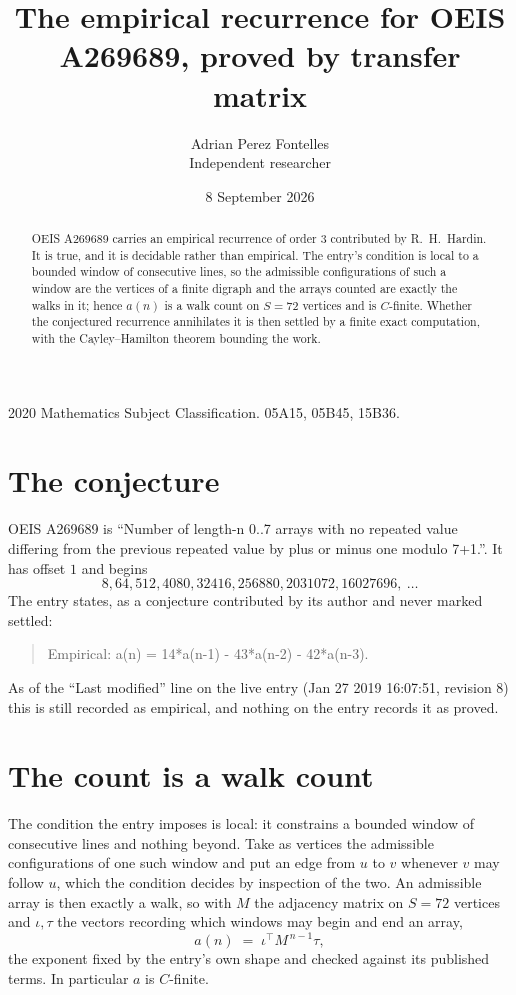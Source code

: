 \documentclass[11pt,a4paper]{article}
\title{The empirical recurrence for OEIS A269689, proved by transfer matrix}
\author{Adrian Perez Fontelles\\ \small Independent researcher}
\date{8 September 2026}
\theoremstyle{plain}
\theoremstyle{definition}
\begin{document}
\maketitle

\begin{abstract}
OEIS A269689 carries an empirical recurrence of order $3$ contributed by R.~H.~Hardin. It is
true, and it is decidable rather than empirical. The entry's condition is local to a bounded window of consecutive lines, so
the admissible configurations of such a window are the vertices of a finite digraph and the
arrays counted are exactly the walks in it; hence $a(n)$ is a walk count on $S=72$ vertices
and is $C$-finite. Whether the conjectured recurrence annihilates it is then settled by a
finite exact computation, with the Cayley--Hamilton theorem bounding the work.
\end{abstract}

\noindent\small 2020 Mathematics Subject Classification. 05A15, 05B45, 15B36.\normalsize

\section{The conjecture}

OEIS A269689 is ``Number of length-n 0..7 arrays with no repeated value differing from the previous repeated value by plus or minus one modulo 7+1.''. It has offset $1$ and begins
\[
8, 64, 512, 4080, 32416, 256880, 2031072, 16027696,\ \dots
\]
The entry states, as a conjecture contributed by its author and never marked settled:
\begin{quote}
Empirical: a(n) = 14*a(n-1) - 43*a(n-2) - 42*a(n-3).
\end{quote}
As of the ``Last modified'' line on the live entry (Jan 27 2019 16:07:51, revision 8) this is still
recorded as empirical, and nothing on the entry records it as proved.

\section{The count is a walk count}

The condition the entry imposes is local: it constrains a bounded window of consecutive lines and nothing beyond. Take as
vertices the admissible configurations of one such window and put an edge from $u$ to $v$
whenever $v$ may follow $u$, which the condition decides by inspection of the two. An
admissible array is then exactly a walk, so with $M$ the adjacency matrix on $S=72$ vertices
and $\iota,\tau$ the vectors recording which windows may begin and end an array,
\[
a(n)\;=\;\iota^{\!\top}M^{\,n-1}\tau ,
\]
the exponent fixed by the entry's own shape and checked against its published terms. In
particular $a$ is $C$-finite.
\end{document}
